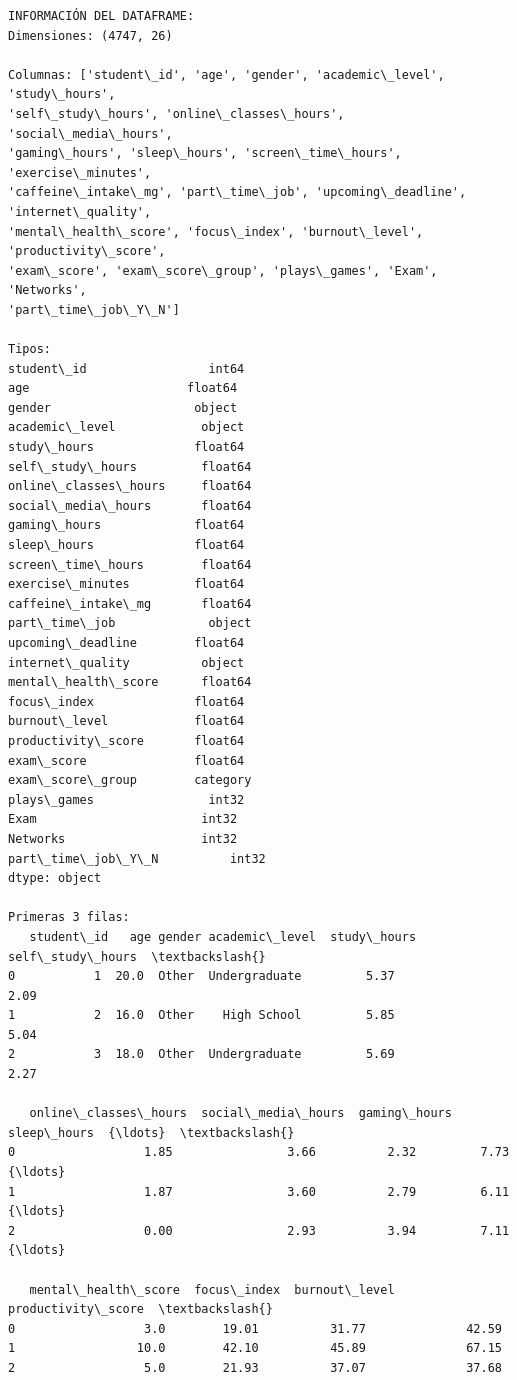 \documentclass[11pt]{article}
\begin{document}
    \begin{Verbatim}[commandchars=\\\{\}]
INFORMACIÓN DEL DATAFRAME:
Dimensiones: (4747, 26)

Columnas: ['student\_id', 'age', 'gender', 'academic\_level', 'study\_hours',
'self\_study\_hours', 'online\_classes\_hours', 'social\_media\_hours',
'gaming\_hours', 'sleep\_hours', 'screen\_time\_hours', 'exercise\_minutes',
'caffeine\_intake\_mg', 'part\_time\_job', 'upcoming\_deadline', 'internet\_quality',
'mental\_health\_score', 'focus\_index', 'burnout\_level', 'productivity\_score',
'exam\_score', 'exam\_score\_group', 'plays\_games', 'Exam', 'Networks',
'part\_time\_job\_Y\_N']

Tipos:
student\_id                 int64
age                      float64
gender                    object
academic\_level            object
study\_hours              float64
self\_study\_hours         float64
online\_classes\_hours     float64
social\_media\_hours       float64
gaming\_hours             float64
sleep\_hours              float64
screen\_time\_hours        float64
exercise\_minutes         float64
caffeine\_intake\_mg       float64
part\_time\_job             object
upcoming\_deadline        float64
internet\_quality          object
mental\_health\_score      float64
focus\_index              float64
burnout\_level            float64
productivity\_score       float64
exam\_score               float64
exam\_score\_group        category
plays\_games                int32
Exam                       int32
Networks                   int32
part\_time\_job\_Y\_N          int32
dtype: object

Primeras 3 filas:
   student\_id   age gender academic\_level  study\_hours  self\_study\_hours  \textbackslash{}
0           1  20.0  Other  Undergraduate         5.37              2.09
1           2  16.0  Other    High School         5.85              5.04
2           3  18.0  Other  Undergraduate         5.69              2.27

   online\_classes\_hours  social\_media\_hours  gaming\_hours  sleep\_hours  {\ldots}  \textbackslash{}
0                  1.85                3.66          2.32         7.73  {\ldots}
1                  1.87                3.60          2.79         6.11  {\ldots}
2                  0.00                2.93          3.94         7.11  {\ldots}

   mental\_health\_score  focus\_index  burnout\_level productivity\_score  \textbackslash{}
0                  3.0        19.01          31.77              42.59
1                 10.0        42.10          45.89              67.15
2                  5.0        21.93          37.07              37.68


\end{Verbatim}
\end{document}
